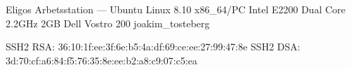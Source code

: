 \documentclass[a5paper]{article}
\begin{document}
   \computerdescription
       {Eligos}
       {Arbetsstation}
       {---}
       {Ubuntu Linux 8.10}
       {x86\_64/PC}
       {Intel E2200 Dual Core 2.2GHz}
       {2GB}
       {Dell Vostro 200}
       {joakim\_tosteberg}


   \sshfingerprintheading
   \begin{sshfingerprint}
SSH2 RSA: 36:10:1f:ee:3f:6e:b5:4a:df:69:ce:ee:27:99:47:8e 
SSH2 DSA: 3d:70:cf:a6:84:f5:76:35:8e:ee:b2:a8:c9:07:c5:ea
   \end{sshfingerprint}
\end{document}
